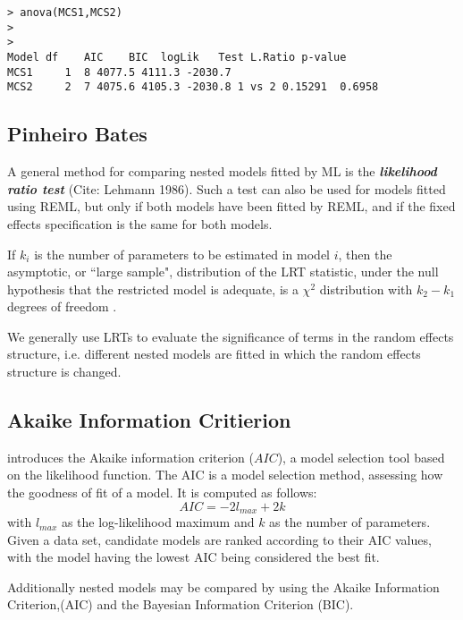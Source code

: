 \documentclass[12pt, a4paper]{article}
\begin{document}
\begin{verbatim}
> anova(MCS1,MCS2)
>
>
Model df    AIC    BIC  logLik   Test L.Ratio p-value
MCS1     1  8 4077.5 4111.3 -2030.7
MCS2     2  7 4075.6 4105.3 -2030.8 1 vs 2 0.15291  0.6958
\end{verbatim}
\subsection{Pinheiro Bates}
A general method for comparing nested models fitted by ML is the \textbf{\emph{likelihood ratio test}} (Cite: Lehmann 1986). Such a test can also be used for models fitted using REML, but only if both models have been fitted by REML, and if the fixed effects specification is the same for both models.

If $k_i$ is the number of parameters to be estimated in model $i$, then the asymptotic, or ``large sample", distribution of the LRT statistic, under the null hypothesis that the restricted model is adequate, is a $\chi^2$ distribution with $k_2-k_1$ degrees of freedom \citep[pg.83]{pb}.

We generally use LRTs to evaluate the significance of terms in the random effects structure, i.e. different nested models are fitted in which the random effects structure is changed.



	\subsection{Akaike Information Critierion}
	\citet{akaike} introduces the Akaike information criterion ($AIC$), a model selection tool based on the likelihood function. The AIC is a model selection method, assessing how the goodness of
	fit of a model. It is computed as follows:
	\begin{displaymath}
	AIC = -2l_{max}+ 2k
	\end{displaymath}
	with $l_{max}$ as the log-likelihood maximum and $k$ as the number
	of parameters. Given a data set, candidate models are ranked according to their AIC values, with the model having the lowest AIC being considered the best fit.
	
	
	Additionally nested models may be compared by using the Akaike Information Criterion,(AIC) and the Bayesian Information Criterion (BIC).
	
\end{document}
